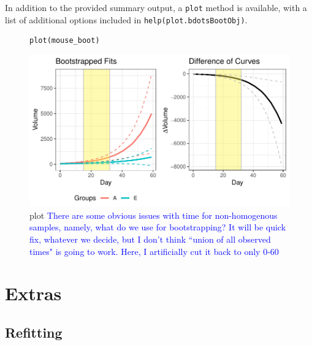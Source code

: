 \documentclass{article}
\providecommand{\cn}[1]{\textcolor{blue}{#1}}
\newcommand{\xt}{\texttt}%
\begin{document}
In addition to the provided summary output, a \xt{plot} method is available, with a list of additional options included in \xt{help(plot.bdotsBootObj)}.

\begin{figure}[H]
\centering
\begin{BVerbatim}
plot(mouse_boot)
\end{BVerbatim}

\includegraphics{img/mouse_boot_plot.pdf}
\caption{plot \cn{There are some obvious issues with time for non-homogenous samples, namely, what do we use for bootstrapping? It will be quick fix, whatever we decide, but I don't think ``union of all observed times" is going to work. Here, I artificially cut it back to only 0-60}}
\end{figure}
%
%
%
%


\section{Extras}

\subsection{Refitting}
\end{document}
